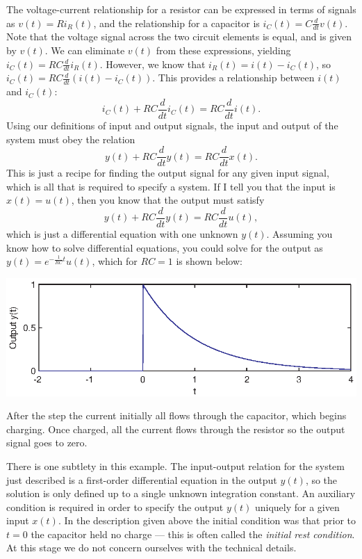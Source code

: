 \documentclass[10pt]{beamer}
\begin{document}
The voltage-current relationship for a resistor can be expressed in terms of signals as $v(t) = R i_R(t)$, and the relationship for a capacitor is $i_C(t) = C \frac{d}{dt} v(t)$.  Note that the voltage signal across the two circuit elements is equal, and is given by $v(t)$.  We can eliminate $v(t)$ from these expressions, yielding $i_C(t) = R C \frac{d}{dt} i_R(t)$.  However, we know that $i_R(t) = i(t) - i_C(t)$, so $i_C(t) = R C \frac{d}{dt} (i(t) - i_C(t))$.  This provides a relationship between $i(t)$ and $i_C(t)$:
\begin{equation*}
  i_C(t) + RC \frac{d}{dt} i_C(t) = RC \frac{d}{dt} i(t).
\end{equation*}
Using our definitions of input and output signals, the input and output of the system must obey the relation
\begin{equation*}
  y(t) + RC \frac{d}{dt} y(t) = RC \frac{d}{dt} x(t).
\end{equation*}
This is just a recipe for finding the output signal for any given input signal, which is all that is required to specify a system.  If I tell you that the input is $x(t) = u(t)$, then you know that the output must satisfy
\begin{equation*}
  y(t) + RC \frac{d}{dt} y(t) = RC \frac{d}{dt} u(t),
\end{equation*}
which is just a differential equation with one unknown $y(t)$.  Assuming you know how to solve differential equations, you could solve for the output as $y(t) = e^{-\frac{1}{RC}t} u(t)$, which for $RC=1$ is shown below:
\begin{center}
  \includegraphics{circuitrcparstepresp}
\end{center}
After the step the current initially all flows through the capacitor, which begins charging.  Once charged, all the current flows through the resistor so the output signal goes to zero.

There is one subtlety in this example.  The input-output relation for the system just described is a first-order differential equation in the output $y(t)$, so the solution is only defined up to a single unknown integration constant.  An auxiliary condition is required in order to specify the output $y(t)$ uniquely for a given input $x(t)$.  In the description given above the initial condition was that prior to $t=0$ the capacitor held no charge --- this is often called the {\em initial rest condition}.  At this stage we do not concern ourselves with the technical details.
\end{document}
